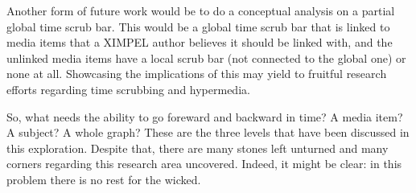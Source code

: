 Another form of future work would be to do a conceptual analysis on a partial global time scrub bar. This would be a global time scrub bar that is linked to media items that a XIMPEL author believes it should be linked with, and the unlinked media items have a local scrub bar (not connected to the global one) or none at all. Showcasing the implications of this may yield to fruitful research efforts regarding time scrubbing and hypermedia.

So, what needs the ability to go foreward and backward in time? A media item? A subject? A whole graph? These are the three levels that have been discussed in this exploration. Despite that, there are many stones left unturned and many corners regarding this research area uncovered. Indeed, it might be clear: in this problem there is no rest for the wicked.